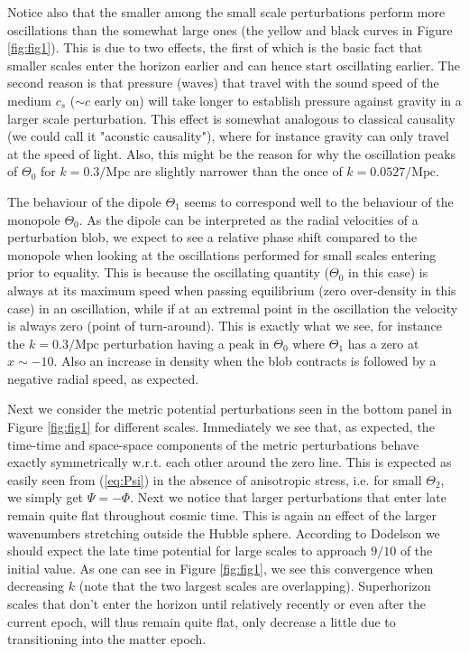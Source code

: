 \documentclass[twocolumn]{aastex62}
\begin{document}
Notice also that the smaller among the small scale perturbations perform more oscillations than the somewhat large ones (the yellow and black curves in Figure \ref{fig:fig1}). This is due to two effects, the first of which is the basic fact that smaller scales enter the horizon earlier and can hence start oscillating earlier. The second reason is that pressure (waves) that travel with the sound speed of the medium $c_s$ ($\sim c$ early on) will take longer to establish pressure against gravity in a larger scale perturbation. This effect is somewhat analogous to classical causality (we could call it "acoustic causality"), where for instance gravity can only travel at the speed of light. Also, this might be the reason for why the oscillation peaks of $\Theta_0$ for $k = 0.3/\mathrm{{Mpc}}$ are slightly narrower than the once of $k = 0.0527/\mathrm{Mpc}$. 

The behaviour of the dipole $\Theta_1$ seems to correspond well to the behaviour of the monopole $\Theta_0$. As the dipole can be interpreted as the radial velocities of a perturbation blob, we expect to see a relative phase shift compared to the monopole when looking at the oscillations performed for small scales entering prior to equality. This is because the oscillating quantity ($\Theta_0$ in this case) is always at its maximum speed when passing equilibrium (zero over-density in this case) in an oscillation, while if at an extremal point in the oscillation the velocity is always zero (point of turn-around). This is exactly what we see, for instance the $k = 0.3/\mathrm{Mpc}$ perturbation having a peak in $\Theta_0$ where $\Theta_1$ has a zero at $x\sim-10$. Also an increase in density when the blob contracts is followed by a negative radial speed, as expected. 

Next we consider the metric potential perturbations seen in the bottom panel in Figure \ref{fig:fig1} for different scales. Immediately we see that, as expected, the time-time and space-space components of the metric perturbations behave exactly symmetrically w.r.t. each other around the zero line. This is expected as easily seen from (\ref{eq:Psi}) in the absence of anisotropic stress, i.e. for small $\Theta_2$, we simply get $\Psi = -\Phi$. Next we notice that larger perturbations that enter late remain quite flat throughout cosmic time. This is again an effect of the larger wavenumbers stretching outside the Hubble sphere. According to Dodelson \cite[p. 191]{dodelson:2003} we should expect the late time potential for large scales to approach $9/10$ of the initial value. As one can see in Figure \ref{fig:fig1}, we see this convergence when decreasing $k$ (note that the two largest scales are overlapping). Superhorizon scales that don't enter the horizon until relatively recently or even after the current epoch, will thus remain quite flat, only decrease a little due to transitioning into the matter epoch. 
\end{document}
